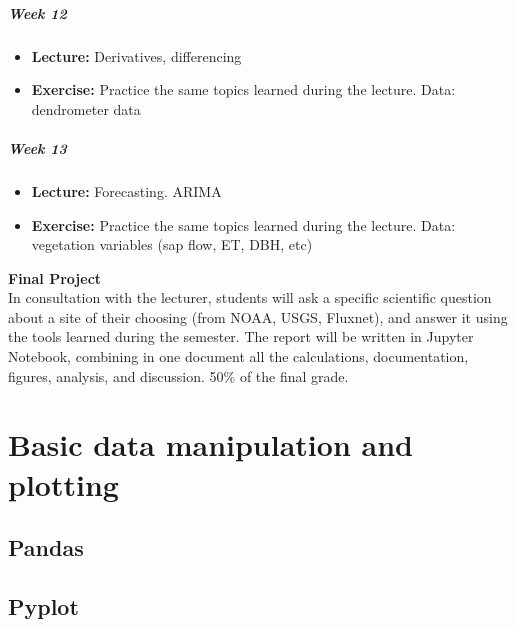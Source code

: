 \documentclass[
  letterpaper,
  DIV=11,
  numbers=noendperiod,
  oneside]{scrreprt}
\providecommand{\tightlist}{%
  \setlength{\itemsep}{0pt}\setlength{\parskip}{0pt}}\usepackage{longtable,booktabs,array}
\begin{document}
\hypertarget{week-12}{%
\subsubsection*{Week 12}\label{week-12}}

\begin{itemize}
\tightlist
\item
  \textbf{Lecture:} Derivatives, differencing
\item
  \textbf{Exercise:} Practice the same topics learned during the
  lecture. Data: dendrometer data
\end{itemize}

\hypertarget{week-13}{%
\subsubsection*{Week 13}\label{week-13}}

\begin{itemize}
\tightlist
\item
  \textbf{Lecture:} Forecasting. ARIMA
\item
  \textbf{Exercise:} Practice the same topics learned during the
  lecture. Data: vegetation variables (sap flow, ET, DBH, etc)
\end{itemize}

\textbf{Final Project}\\
In consultation with the lecturer, students will ask a specific
scientific question about a site of their choosing (from NOAA, USGS,
Fluxnet), and answer it using the tools learned during the semester. The
report will be written in Jupyter Notebook, combining in one document
all the calculations, documentation, figures, analysis, and discussion.
50\% of the final grade.

\part{Basic data manipulation and plotting}

\hypertarget{pandas}{%
\chapter{Pandas}\label{pandas}}

\hypertarget{pyplot}{%
\chapter{Pyplot}\label{pyplot}}
\end{document}
